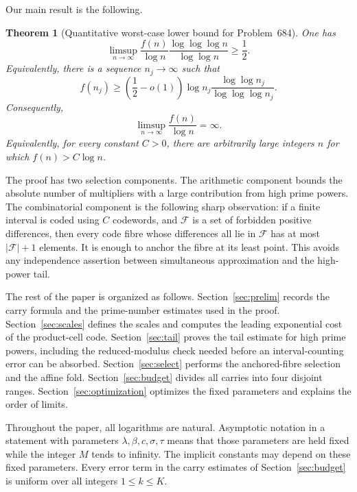 \documentclass[11pt]{article}
\newtheorem{theorem}{Theorem}[section]
\theoremstyle{remark}
\newcommand{\F}{\mathcal F}
\begin{document}
Our main result is the following.

\begin{theorem}[Quantitative worst-case lower bound for Problem~684]
\label{thm:main}
One has
\begin{equation}\label{eq:main}
 \boxed{
 \limsup_{n\to\infty}
 \frac{f(n)}{\log n}
 \frac{\log\log\log n}{\log\log n}\geq\frac12.}
\end{equation}
Equivalently, there is a sequence \(n_j\to\infty\) such that
\[
 f(n_j)\geq\left(\frac12-o(1)\right)
 \log n_j\frac{\log\log n_j}{\log\log\log n_j}.
\]
Consequently,
\begin{equation}\label{eq:unbounded}
 \limsup_{n\to\infty}\frac{f(n)}{\log n}=\infty.
\end{equation}
Equivalently, for every constant \(C>0\), there are arbitrarily large
integers \(n\) for which \(f(n)>C\log n\).
\end{theorem}

The proof has two selection components.  The arithmetic component bounds the
absolute number of multipliers with a large contribution from high prime
powers.  The
combinatorial component is the following sharp observation: if a finite
interval is coded using \(C\) codewords, and \(\F\) is a set of forbidden
positive differences, then every code fibre whose differences all lie in
\(\F\) has at most \(\lvert\F\rvert+1\) elements.  It is enough to anchor the
fibre at its least point.  This avoids any independence assertion between
simultaneous approximation and the high-power tail.

The rest of the paper is organized as follows.  Section~\ref{sec:prelim}
records the carry formula and the prime-number estimates used in the proof.
Section~\ref{sec:scales} defines the scales and computes the leading exponential
cost of the product-cell code.  Section~\ref{sec:tail} proves the
tail estimate for high prime powers, including the reduced-modulus check needed
before an interval-counting error can be absorbed.  Section~\ref{sec:select}
performs the anchored-fibre selection and the affine fold.
Section~\ref{sec:budget} divides all carries into four disjoint ranges.
Section~\ref{sec:optimization} optimizes the fixed parameters and explains
the order of limits.

Throughout the paper, all logarithms are natural.  Asymptotic notation in a
statement with parameters
\(\lambda,\beta,c,\sigma,\tau\) means that those parameters are held fixed
while the integer \(M\) tends to infinity.  The implicit constants may depend
on these fixed parameters.  Every error term in the carry estimates of
Section~\ref{sec:budget} is uniform over all integers \(1\leq k\leq K\).
\end{document}
